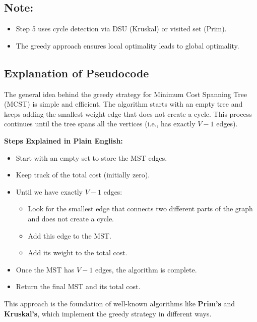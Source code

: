 \documentclass[14pt,a4paper]{extarticle}
\begin{document}
\newpage
\subsection*{Note:}
\begin{itemize}
    \item Step 5 uses cycle detection via DSU (Kruskal) or visited set (Prim).
    \item The greedy approach ensures local optimality leads to global optimality.
\end{itemize}

\subsection*{Explanation of Pseudocode}

The general idea behind the greedy strategy for Minimum Cost Spanning Tree (MCST) is simple and efficient. The algorithm starts with an empty tree and keeps adding the smallest weight edge that does not create a cycle. This process continues until the tree spans all the vertices (i.e., has exactly \(V-1\) edges).

\vspace{1em}
\textbf{Steps Explained in Plain English:}
\begin{itemize}
    \item Start with an empty set to store the MST edges.
    \item Keep track of the total cost (initially zero).
    \item Until we have exactly \(V-1\) edges:
    \begin{itemize}
        \item Look for the smallest edge that connects two different parts of the graph and does not create a cycle.
        \item Add this edge to the MST.
        \item Add its weight to the total cost.
    \end{itemize}
    \item Once the MST has \(V-1\) edges, the algorithm is complete.
    \item Return the final MST and its total cost.
\end{itemize}

\vspace{1em}
This approach is the foundation of well-known algorithms like \textbf{Prim’s} and \textbf{Kruskal’s}, which implement the greedy strategy in different ways.
\end{document}

